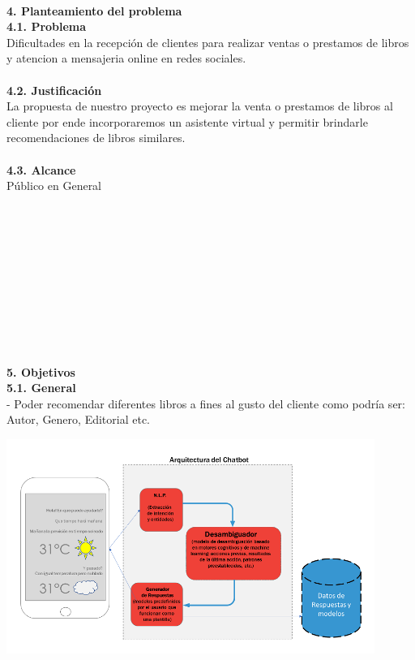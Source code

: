 \begin{flushleft}
\begin{itemize}
\textbf{ }\\

\textbf{4.	Planteamiento del problema}\\
\textbf{4.1. 	Problema}\\

Dificultades en la recepción de clientes para realizar ventas o prestamos de libros y atencion a mensajeria online en redes sociales.\textbf{ }\\
\textbf{ }\\
\textbf{4.2.	Justificación }\\
La propuesta de nuestro proyecto es mejorar la venta o prestamos de libros al cliente por ende incorporaremos un asistente virtual y permitir brindarle recomendaciones de libros similares. 
\textbf{ }\\
\textbf{ }\\
\textbf{4.3.	Alcance }\\
Público en General

\textbf{ }\\
\textbf{ }\\
\textbf{ }\\
\textbf{ }\\
\textbf{ }\\
\textbf{ }\\
\textbf{ }\\
\textbf{ }\\
\textbf{ }\\
\textbf{ }\\
\textbf{5.      Objetivos}\\
\textbf{5.1.   General}\\
-	Poder recomendar diferentes libros a fines al gusto del cliente como podría ser: Autor, Genero, Editorial etc.
\begin{center}
	\includegraphics[width=12cm]{./Imagenes/chatbot} 
	\end{center}


\end{itemize}
\end{flushleft}
